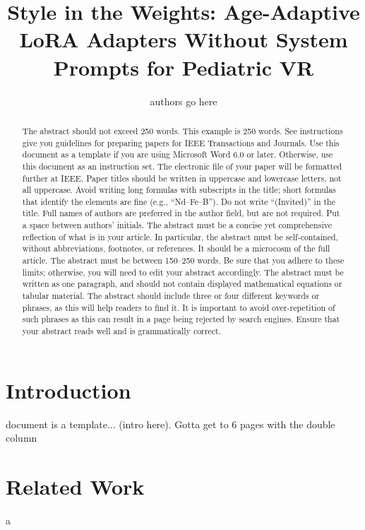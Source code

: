 \documentclass[journal]{IEEEtai}
\begin{document}
\title{Style in the Weights: Age-Adaptive LoRA Adapters Without System Prompts for Pediatric VR} 


\author{authors go here}

\maketitle

\begin{abstract}
The abstract should not exceed 250 words. This example is 250 words. See instructions give you guidelines for preparing papers for IEEE Transactions and Journals. Use this document as a template if you are using Microsoft {\bi Word} 6.0 or later. Otherwise, use this document as an instruction set. The electronic file of your paper will be formatted further at IEEE. Paper titles should be written in uppercase and lowercase letters, not all uppercase. Avoid writing long formulas with subscripts in the title; short formulas that identify the elements are fine (e.g., ``Nd--Fe--B''). Do not write ``(Invited)'' in the title. Full names of authors are preferred in the author field, but are not required. Put a space between authors' initials. The abstract must be a concise yet comprehensive reflection of what is in your article. In particular, the abstract must be self-contained, without abbreviations, footnotes, or references. It should be a microcosm of the full article. The abstract must be between 150--250 words. Be sure that you adhere to these limits; otherwise, you will need to edit your abstract accordingly. The abstract must be written as one paragraph, and should not contain displayed mathematical equations or tabular material. The abstract should include three or four different keywords or phrases, as this will help readers to find it. It is important to avoid over-repetition of such phrases as this can result in a page being rejected by search engines. Ensure that your abstract reads well and is grammatically correct.
\end{abstract}

\section{Introduction}

 document is a template... (intro here). Gotta get to 6 pages with the double column

\section{Related Work}
a
\end{document}
